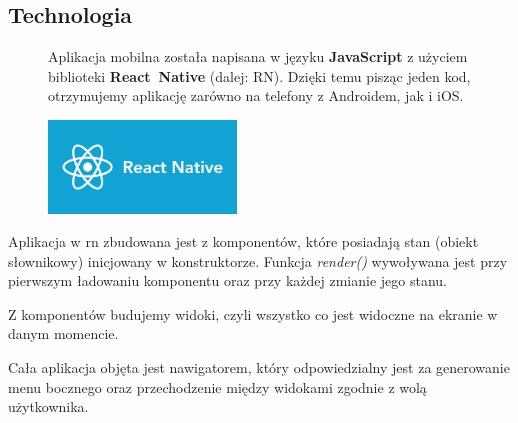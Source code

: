 \subsection{Technologia}
\begin{figure}[!htb]
    \centering
    \begin{minipage}{.6\textwidth}
Aplikacja mobilna została napisana w języku \textbf{JavaScript} z użyciem biblioteki \textbf{React~Native} (dalej: RN). Dzięki temu pisząc jeden kod, otrzymujemy aplikację zarówno na telefony z Androidem, jak i iOS.
    \end{minipage}%
    \begin{minipage}{.4\textwidth}
        \centering
        \includegraphics[width=5cm]{images/ReactNative.png}\label{RN_logo}
    \end{minipage}
\end{figure}

Aplikacja w \acrshort{rn} zbudowana jest z komponentów, które posiadają stan (obiekt słownikowy) inicjowany w konstruktorze. Funkcja \textit{render()} wywoływana jest przy pierwszym ładowaniu komponentu oraz przy każdej zmianie jego stanu. 

Z komponentów budujemy widoki, czyli wszystko co jest widoczne na ekranie w danym momencie.

Cała aplikacja objęta jest nawigatorem, który odpowiedzialny jest za generowanie menu bocznego oraz przechodzenie między widokami zgodnie z wolą użytkownika. \\

